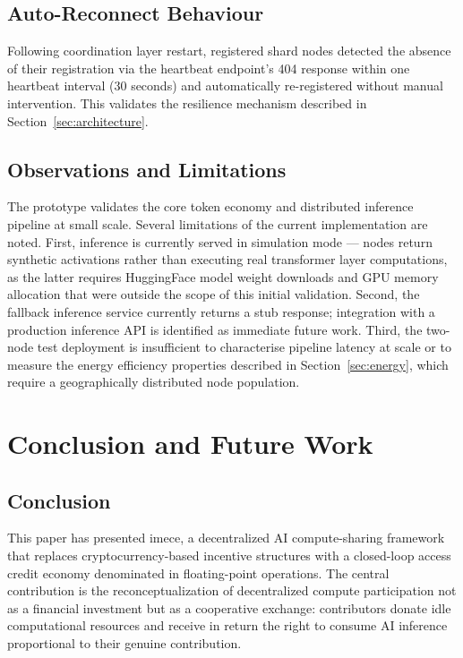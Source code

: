 \documentclass[12pt]{article}
\begin{document}
\subsection{Auto-Reconnect Behaviour}

Following coordination layer restart, registered shard nodes detected the absence of their registration via the heartbeat endpoint's 404 response within one heartbeat interval (30 seconds) and automatically re-registered without manual intervention. This validates the resilience mechanism described in Section~\ref{sec:architecture}.

\subsection{Observations and Limitations}

The prototype validates the core token economy and distributed inference pipeline at small scale. Several limitations of the current implementation are noted. First, inference is currently served in simulation mode — nodes return synthetic activations rather than executing real transformer layer computations, as the latter requires HuggingFace model weight downloads and GPU memory allocation that were outside the scope of this initial validation. Second, the fallback inference service currently returns a stub response; integration with a production inference API is identified as immediate future work. Third, the two-node test deployment is insufficient to characterise pipeline latency at scale or to measure the energy efficiency properties described in Section~\ref{sec:energy}, which require a geographically distributed node population.

\section{Conclusion and Future Work}
\label{sec:conclusion}

\subsection{Conclusion}

This paper has presented imece, a decentralized AI compute-sharing framework that replaces cryptocurrency-based incentive structures with a closed-loop access credit economy denominated in floating-point operations. The central contribution is the reconceptualization of decentralized compute participation not as a financial investment but as a cooperative exchange: contributors donate idle computational resources and receive in return the right to consume AI inference proportional to their genuine contribution.
\end{document}

